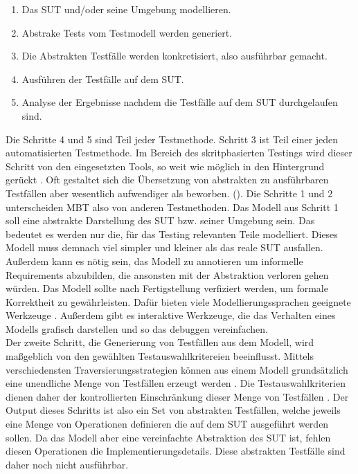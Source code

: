 \begin{enumerate}
\item Das SUT und/oder seine Umgebung modellieren.
\item Abstrake Tests vom Testmodell werden generiert.
\item Die Abstrakten Testfälle werden konkretisiert, also ausführbar gemacht.
\item Ausführen der Testfälle auf dem SUT.
\item Analyse der Ergebnisse nachdem die Testfälle auf dem SUT durchgelaufen sind.
\end{enumerate}


Die Schritte 4 und 5 sind Teil jeder Testmethode. Schritt 3 ist Teil einer jeden automatisierten Testmethode. Im Bereich des skritpbasierten Testings wird dieser Schritt von den eingesetzten Tools, so weit wie möglich in den Hintergrund gerückt . Oft gestaltet sich die Übersetzung von abstrakten zu ausführbaren Testfällen aber wesentlich aufwendiger als beworben. ().
Die Schritte 1 und 2 unterscheiden MBT also von anderen Testmethoden. Das Modell aus Schritt 1 soll eine abstrakte Darstellung des SUT bzw. seiner Umgebung sein. Das bedeutet es werden nur die, für das Testing relevanten Teile modelliert. Dieses Modell muss demnach viel simpler und kleiner als das reale SUT ausfallen. Außerdem kann es nötig sein, das Modell zu annotieren um informelle Requirements abzubilden, die ansonsten mit der Abstraktion verloren gehen würden. Das Modell sollte nach Fertigstellung verfiziert werden, um formale Korrektheit zu gewährleisten. Dafür bieten viele Modellierungssprachen geeignete Werkzeuge \cite{kaneiwa_consistency_2006}. Außerdem gibt es interaktive Werkzeuge, die das Verhalten eines Modells grafisch darstellen und so das debuggen vereinfachen.\\
Der zweite Schritt, die Generierung von Testfällen aus dem Modell, wird maßgeblich von den gewählten Testauswahlkritereien beeinflusst. Mittels verschiedensten Traversierungsstrategien können aus einem Modell grundsätzlich eine unendliche Menge von Testfällen erzeugt werden \cite{utting_practical_2007}. Die Testauswahlkriterien dienen daher der kontrollierten Einschränkung dieser Menge von Testfällen . Der Output dieses Schritts ist also ein Set von abstrakten Testfällen, welche jeweils eine Menge von Operationen definieren die auf dem SUT ausgeführt werden sollen. Da das Modell aber eine vereinfachte Abstraktion des SUT ist, fehlen diesen Operationen die Implementierungsdetails. Diese abstrakten Testfälle sind daher noch nicht ausführbar.\\
